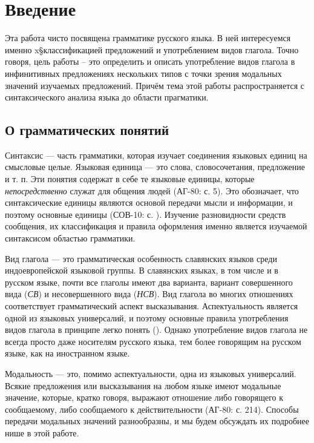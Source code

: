 \section{Введение}

Эта работа чисто посвящена грамматике русского языка. В ней интересуемся именно x§классификацией предложений и употреблением видов глагола. Точно говоря, цель работы -- это определить и описать употребление видов глагола в инфинитивных предложениях нескольких типов с точки зрения модальных значений изучаемых предложений. Причём тема этой работы распространяется с синтаксического анализа языка до области прагматики.

\subsection{О грамматических понятий}

Синтаксис --- часть грамматики, которая изучает соединения языковых единиц на смысловые целые. Языковая единица --- это слова, словосочетания, предложение и т. п. Эти понятия содержат в себе те языковые единицы, которые \textit{непосредственно} служат для общения людей (АГ-80: с. 5). Это обозначает, что синтаксические единицы являются основой передачи мысли и информации, и поэтому основные единицы (СОВ-10: с. ). Изучение разновидности средств сообщения, их классификация и правила оформления именно является изучаемой синтаксисом областью грамматики.

Вид глагола --- это грамматическая особенность славянских языков среди индоевропейской языковой группы. В славянских языках, в том числе и в русском языке, почти все глаголы имеют два варианта, вариант совершенного вида (\textit{СВ}) и несовершенного вида (\textit{НСВ}). Вид глагола во многих отношениях соответствует грамматический аспект высказывания. Аспектуальность является одной из языковых универсалий, и поэтому основные правила употребления видов глагола в принципе легко понять (). Однако употребление видов глагола не всегда просто даже носителям русского языка, тем более говорящим на русском языке, как на иностранном языке.

Модальность --- это, помимо аспектуальности, одна из языковых универсалий. Всякие предложения или высказывания на любом языке имеют модальные значение, которые, кратко говоря, выражают отношение либо говорящего к сообщаемому, либо сообщаемого к действительности (АГ-80: с. 214). Способы передачи модальных значений разнообразны, и мы будем обсуждать их подробнее нише в этой работе.

